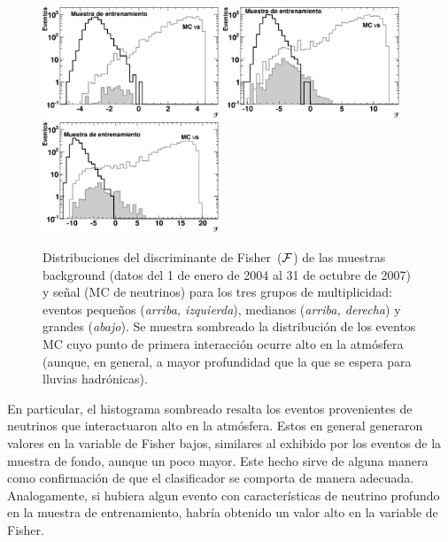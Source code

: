 	\begin{figure}
	\begin{center}
	\includegraphics [width=0.47\textwidth]{fig/seleccionAuger/fishDist_altos_1.pdf}\hfill
	\includegraphics [width=0.47\textwidth]{fig/seleccionAuger/fishDist_altos_2.pdf}\\
	\includegraphics [width=0.47\textwidth]{fig/seleccionAuger/fishDist_altos_3.pdf}
	\end{center}
	\caption{
	Distribuciones del discriminante de Fisher~($\cal{F}$) de las muestras background (datos del 1 de enero de 2004 al 31 de octubre de 2007) y señal (MC de neutrinos) para los tres grupos de multiplicidad: eventos pequeños (\textit{arriba, izquierda}), medianos (\textit{arriba, derecha}) y grandes (\textit{abajo}). Se muestra sombreado la distribución de los eventos MC cuyo punto de primera interacción ocurre alto en la atmósfera (aunque, en general, a mayor profundidad que la que se espera para lluvias hadrónicas).
	}
	\label{fig:fisherDGH}
	\end{figure}
	En particular, el histograma sombreado resalta los eventos provenientes de neutrinos que interactuaron alto en la atmósfera.
	Estos en general generaron valores en la variable de Fisher bajos, similares al exhibido por los eventos de la muestra de fondo, aunque un poco mayor.
	Este hecho sirve de alguna manera como confirmación de que el clasificador se comporta de manera adecuada. 
	Analogamente, si hubiera algun evento con características de neutrino profundo en la muestra de entrenamiento, habría obtenido un valor alto en la variable de Fisher.
	
